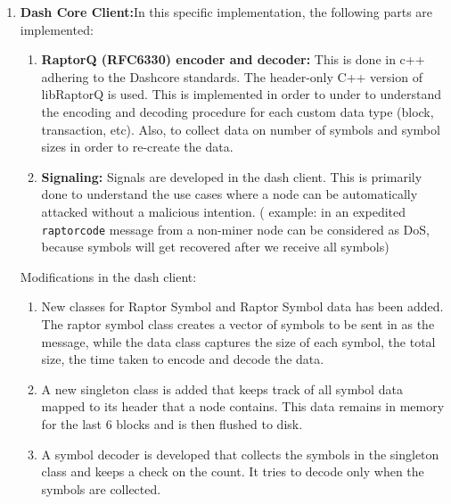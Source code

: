 \begin{enumerate}
    \item \textbf{Dash Core Client:}In this specific implementation, the
        following parts are implemented:

        \begin{enumerate}
            \item \textbf{ RaptorQ (RFC6330) encoder and decoder:} This is done in c++
                adhering to the Dashcore standards. The header-only C++ version
                of libRaptorQ is used. This is implemented in order to under to
                understand the encoding and decoding procedure for each custom
                data type (block, transaction, etc). Also, to collect data on
                number of symbols and symbol sizes in order to re-create the
                data.

            \item \textbf{Signaling:} Signals are developed in the dash client. This is
                primarily done to understand the use cases where a node can be
                automatically attacked without a malicious intention. ( example:
                in an expedited \texttt{raptorcode} message from a non-miner node can be
                considered as DoS, because symbols will get recovered after we
                receive all symbols) 
        \end{enumerate}

        Modifications in the dash client:

        \begin{enumerate}
            \item New classes for Raptor Symbol and Raptor Symbol data has been added.
                The raptor symbol class creates a vector of symbols to be sent in as the
                message, while the data class captures the size of each symbol, the
                total size, the time taken to encode and decode the data.
            \item A new singleton class is added that keeps track of all symbol data
                mapped to its header that a node contains. This data remains in memory
                for the last 6 blocks and is then flushed to disk.
            \item A symbol decoder is developed that collects the symbols in the
                singleton class and keeps a check on the count. It tries to decode only
                when the symbols are collected.
        \end{enumerate}


\end{enumerate}
